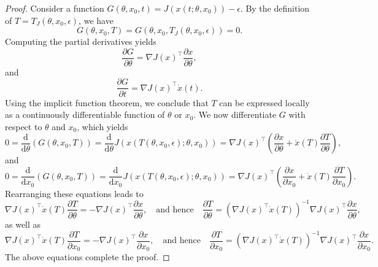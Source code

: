 \documentclass{article}
\newcommand{\dd}{\mathrm{d}}
\begin{document}
\begin{proof}
    Consider a function $ G(\theta, x_0, t) = J(x(t; \theta, x_0)) - \epsilon $. By the definition of $ T = T_J(\theta, x_0, \epsilon) $, we have
    \[
    G(\theta, x_0, T) = G(\theta, x_0, T_J(\theta, x_0, \epsilon)) = 0.
    \]
    Computing the partial derivatives yields
    \[
    \frac{\partial G}{\partial \theta} = \nabla J(x)^\top \frac{\partial x}{\partial \theta},
    \]
    and
    \[
    \frac{\partial G}{\partial t} = \nabla J(x)^\top \dot{x}(t).
    \]
    Using the implicit function theorem, we conclude that $ T $ can be expressed locally as a continuously differentiable function of $ \theta $ or $ x_0 $. We now differentiate $ G $ with respect to $ \theta $ and $ x_0 $, which yields
    \[
    0 = \frac{\dd}{\dd \theta} \left( G(\theta, x_0, T) \right)
    = \frac{\dd}{\dd \theta} J\left( x(T(\theta, x_0, \epsilon); \theta, x_0) \right)
    = \nabla J(x)^\top \left( \frac{\partial x}{\partial \theta} + \dot{x}(T) \frac{\partial T}{\partial \theta} \right),
    \]
    and
    \[
    0 = \frac{\dd}{\dd x_0} \left( G(\theta, x_0, T) \right)
    = \frac{\dd}{\dd x_0} J\left( x(T(\theta, x_0, \epsilon); \theta, x_0) \right)
    = \nabla J(x)^\top \left( \frac{\partial x}{\partial x_0} + \dot{x}(T) \frac{\partial T}{\partial x_0} \right).
    \]
    Rearranging these equations leads to
    \[
    \nabla J(x)^\top \dot{x}(T) \frac{\partial T}{\partial \theta}
    = -\nabla J(x)^\top \frac{\partial x}{\partial \theta},
    \quad \text{and hence} \quad
    \frac{\partial T}{\partial \theta}
    = \left( \nabla J(x)^\top \dot{x}(T) \right)^{-1} \nabla J(x)^\top \frac{\partial x}{\partial \theta},
    \]
    as well as
    \[
    \nabla J(x)^\top \dot{x}(T) \frac{\partial T}{\partial x_0}
    = -\nabla J(x)^\top \frac{\partial x}{\partial x_0},
    \quad \text{and hence} \quad
    \frac{\partial T}{\partial x_0}
    = \left( \nabla J(x)^\top \dot{x}(T) \right)^{-1} \nabla J(x)^\top \frac{\partial x}{\partial x_0}.
    \]
    The above equations complete the proof. 
\end{proof}
\end{document}
